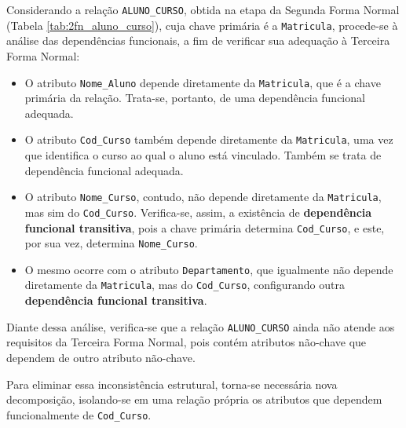 \begin{tcolorbox}[breakable, colback=blue!5,colframe=blue!40!black,title=Situação exemplo]

    Considerando a relação \texttt{ALUNO\_CURSO}, obtida na etapa da Segunda Forma Normal (Tabela \ref{tab:2fn_aluno_curso}), cuja chave primária é a \texttt{Matricula}, procede-se à análise das dependências funcionais, a fim de verificar sua adequação à Terceira Forma Normal:

    \begin{itemize}
        \item O atributo \texttt{Nome\_Aluno} depende diretamente da \texttt{Matricula}, que é a chave primária da relação. Trata-se, portanto, de uma dependência funcional adequada.

        \item O atributo \texttt{Cod\_Curso} também depende diretamente da \texttt{Matricula}, uma vez que identifica o curso ao qual o aluno está vinculado. Também se trata de dependência funcional adequada.

        \item O atributo \texttt{Nome\_Curso}, contudo, não depende diretamente da \texttt{Matricula}, mas sim do \texttt{Cod\_Curso}. Verifica-se, assim, a existência de \textbf{dependência funcional transitiva}, pois a chave primária determina \texttt{Cod\_Curso}, e este, por sua vez, determina \texttt{Nome\_Curso}.

        \item O mesmo ocorre com o atributo \texttt{Departamento}, que igualmente não depende diretamente da \texttt{Matricula}, mas do \texttt{Cod\_Curso}, configurando outra \textbf{dependência funcional transitiva}.
    \end{itemize}

    \vspace{0.4cm}

    Diante dessa análise, verifica-se que a relação \texttt{ALUNO\_CURSO} ainda não atende aos requisitos da Terceira Forma Normal, pois contém atributos não-chave que dependem de outro atributo não-chave.

    Para eliminar essa inconsistência estrutural, torna-se necessária nova decomposição, isolando-se em uma relação própria os atributos que dependem funcionalmente de \texttt{Cod\_Curso}.

    \vspace{0.5cm}

    \centering
    \renewcommand{\arraystretch}{1.2}


\end{tcolorbox}
